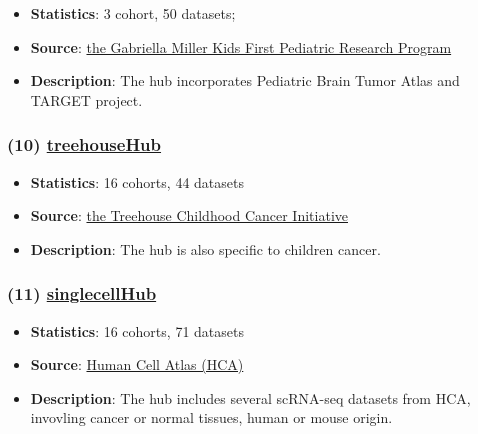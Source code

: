 \documentclass[
]{book}
\providecommand{\tightlist}{%
  \setlength{\itemsep}{0pt}\setlength{\parskip}{0pt}}
\begin{document}
\begin{itemize}
\tightlist
\item
  \textbf{Statistics}: 3 cohort, 50 datasets;
\item
  \textbf{Source}: \href{https://portal.kidsfirstdrc.org/}{the Gabriella Miller Kids First Pediatric Research Program}
\item
  \textbf{Description}: The hub incorporates Pediatric Brain Tumor Atlas and TARGET project.
\end{itemize}

\subsubsection*{\texorpdfstring{(10) \href{https://xenabrowser.net/datapages/?host=https\%3A\%2F\%2Fxena.treehouse.gi.ucsc.edu\%3A443&removeHub=https\%3A\%2F\%2Fxena.treehouse.gi.ucsc.edu\%3A443}{treehouseHub}}{(10) treehouseHub}}\label{treehousehub}

\begin{itemize}
\tightlist
\item
  \textbf{Statistics}: 16 cohorts, 44 datasets
\item
  \textbf{Source}: \href{https://treehousegenomics.soe.ucsc.edu/public-data/}{the Treehouse Childhood Cancer Initiative}
\item
  \textbf{Description}: The hub is also specific to children cancer.
\end{itemize}

\subsubsection*{\texorpdfstring{(11) \href{https://singlecellnew.xenahubs.net}{singlecellHub}}{(11) singlecellHub}}\label{singlecellhub}

\begin{itemize}
\tightlist
\item
  \textbf{Statistics}: 16 cohorts, 71 datasets
\item
  \textbf{Source}: \href{https://data.humancellatlas.org/}{Human Cell Atlas (HCA)}
\item
  \textbf{Description}: The hub includes several scRNA-seq datasets from HCA, invovling cancer or normal tissues, human or mouse origin.
\end{itemize}
\end{document}
